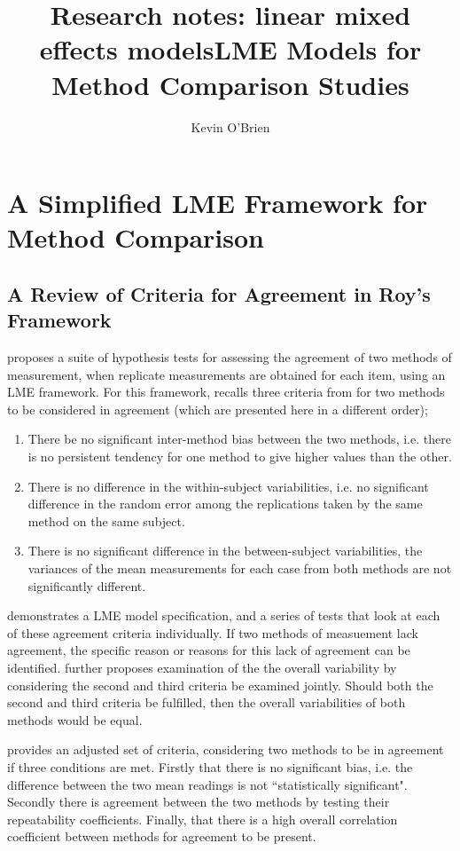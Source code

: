\documentclass[12pt, a4paper]{report}
\title{Research notes: linear mixed effects models}
\author{ } \date{ }
\theoremstyle{plain}
\theoremstyle{definition}
\theoremstyle{remark}
\begin{document}
\author{Kevin O'Brien}
\title{LME Models for Method Comparison Studies}

\chapter{A Simplified LME Framework for Method Comparison}

\section{A Review of Criteria for Agreement in Roy's Framework}

\citet{ARoy2009} proposes a suite of hypothesis tests for assessing the agreement of two methods of measurement, when replicate measurements are obtained for each item, using an LME framework. For this framework, \citet{ARoy2009} recalls three criteria from \citet{Barnhart} for two methods to be considered in agreement (which are presented here in a different order);

\begin{enumerate}
\item There be no significant inter-method bias between the two methods, i.e. there is no persistent tendency for one method to give higher values than the other.
\item There is no difference in the within-subject variabilities, i.e. no significant difference in the random error among the replications taken by the same method on the same subject. 
\item There is no significant difference in the between-subject variabilities, the variances of the mean measurements for each case from both methods are not significantly different.
\end{enumerate} 
\citet{ARoy2009} demonstrates a LME model specification, and a series of tests that look at each of these agreement criteria individually. If two methods of measuement lack agreement, the specific reason or reasons for this lack of agreement can be identified. \citet{ARoy2009} further proposes examination of the the overall variability by considering the second and third criteria be examined jointly. Should both the second and third criteria be fulfilled, then the overall variabilities of both methods would be equal.

\citet{ARoy2009} provides an adjusted set of criteria, considering two methods to be in agreement if three conditions are met. Firstly that there is no significant bias, i.e. the difference between the two
mean readings is not ``statistically significant". Secondly there is
agreement between the two methods by testing their
repeatability coefficients. Finally, that there is a high overall correlation coefficient between methods for agreement to be present.
\end{document}
